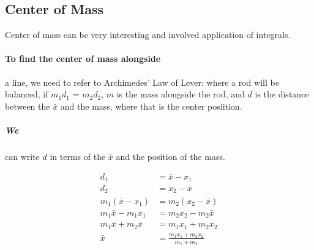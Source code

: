 \subsection{Center of Mass}
Center of mass can be very interesting and involved application of integrals. 

\paragraph*{To find the center of mass alongside} a line, we need to refer to Archimedes' Law of Lever: where a rod will be balanced, 
if $m_1d_1$ = $m_2d_2$, $m$ is the mass alongside the rod, and $d$ is the distance between the $\bar{x}$ and the mass, where that is the center posiition. 

\subparagraph*{We} can write $d$ in terms of the $\bar{x}$ and the position of the mass. 

\begin{align}
	d_1 &= \bar{x} - x_1 \\ 
	d_2 &= x_2 - \bar{x} \\ 
	m_1(\bar{x} - x_1) &= m_2(x_2-\bar{x}) \\ 
	m_1\bar{x} - m_1x_1 &=m_2x_2-m_2\bar{x} \\ 
	m_1\bar{x}+m_2\bar{x} &= m_1x_1+m_2x_2 \\ 
	\bar{x} &= \frac{m_1x_1+m_2x_2}{m_1+m_2}
\end{align}

